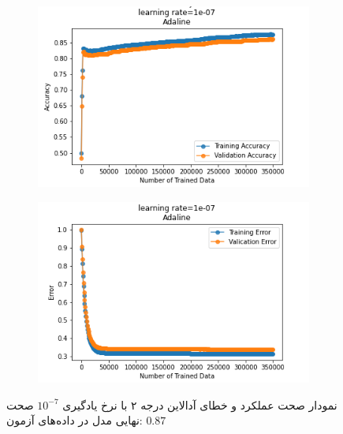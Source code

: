 \documentclass[12pt, a4paper]{article}
\begin{document}
\begin{figure}[h]
    \begin{subfigure}{0.45\linewidth}
        \centering
        \includegraphics[width=\linewidth]{images/6/adaline/lr/acc_1e-07.png}
    \end{subfigure}
    \hfil
    \begin{subfigure}{0.45\linewidth}
        \centering
        \includegraphics[width=\linewidth]{images/6/adaline/lr/error_1e-07.png}
    \end{subfigure}
    \caption{نمودار صحت عملکرد‌ و خطای آدالاین درجه ۲ با نرخ یادگیری $10^{-7}$
    \newline
    صحت نهایی مدل در داده‌های آزمون: $0.87$}
\end{figure}
\vspace{1cm}
\end{document}
